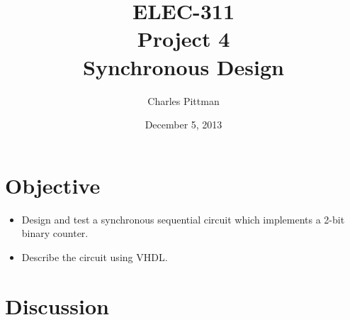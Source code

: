 \documentclass{article}
\author{Charles Pittman}
\title{ELEC-311\\ Project 4\\ Synchronous Design}
\date{December 5, 2013}
\begin{document}
\maketitle %

\pagebreak


\section{Objective}
\label{sec:objective}

\begin{itemize}
\item Design and test a synchronous sequential circuit which implements a 2-bit binary counter.
\item Describe the circuit using VHDL.
\end{itemize}

\section{Discussion}
\label{sec:procedure}




\end{document}
